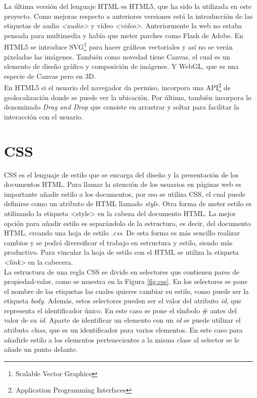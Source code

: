 La última versión del lenguaje HTML es HTML5, que ha sido la utilizada en este proyecto. Como mejoras respecto a anteriores versiones está la introducción de las etiquetas de audio \textit{\textless audio\textgreater} y vídeo \textit{\textless video\textgreater}. Anteriormente la web no estaba pensada para multimedia y había que meter parches como Flash de Adobe. En HTML5 se introduce SVG\footnote{Scalable Vector Graphics } para hacer gráficos vectoriales y así no se verán pixeladas las imágenes. También como novedad tiene Canvas, el cual es un elemento de diseño gráfico y composición de imágenes. Y WebGL, que es una especie de Canvas pero en 3D. \\

En HTML5 si el usuario del navegador da permiso, incorpora una API\footnote{Application Programming Interfaces} de geolocalización donde se puede ver la ubicación. Por último, también incorpora lo denominado \textit{Drag and Drop} que consiste en arrastrar y soltar para facilitar la interacción con el usuario.\\


\newpage
\section{CSS}
CSS es el lenguaje de estilo que se encarga del diseño y la presentación de los documentos HTML. Para llamar la atención de los usuarios en páginas web es importante añadir estilo a los documentos, por eso se utiliza CSS, el cual puede definirse como un atributo de HTML llamado \textit{style}. Otra forma de meter estilo es utilizando la etiqueta {\textless style\textgreater} en la cabeza del documento HTML. La mejor opción para añadir estilo es separándolo de la estructura, es decir, del documento HTML, creando una hoja de estilo \textit{.css}. De esta forma es más sencillo realizar cambios y se podrá diversificar el trabajo en estructura y estilo, siendo más productivo. Para vincular la hoja de estilo con el HTML se utiliza la etiqueta \textit{\textless link\textgreater} en la cabecera.\\

La estructura de una regla CSS se divide en selectores que contienen pares de propiedad-valor, como se muestra en la Figura \ref{fig:css}. En los selectores se pone el nombre de las etiquetas las cuales quieres cambiar su estilo, como puede ser la etiqueta \textit{body}. Además, estos selectores pueden ser el valor del atributo \textit{id}, que representa el identificador único. En este caso se pone el símbolo \# antes del valor de su \textit{id}. Aparte de identificar un elemento con un \textit{id} se puede utilizar el atributo \textit{class}, que es un identificador para varios elementos. En este caso para añadirle estilo a los elementos pertenecientes a la misma clase al selector se le añade un punto delante.

